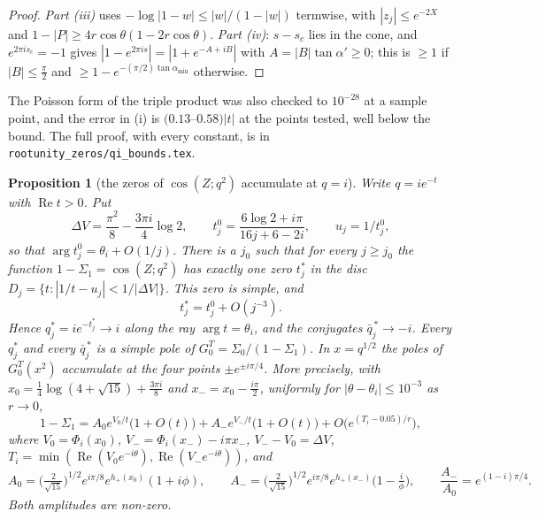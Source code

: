 \documentclass[11pt]{article}
\theoremstyle{plain}
\newtheorem{proposition}[theorem]{Proposition}
\theoremstyle{definition}
\theoremstyle{remark}
\theoremstyle{plain}\newtheorem*{maintheorem}{Main Theorem}
\begin{document}
\begin{proof}
\emph{Part \textup{(iii)}} uses $-\log|1-w|\le|w|/(1-|w|)$ termwise, with $|z_j|\le e^{-2X}$ and
$1-|P|\ge4r\cos\theta(1-2r\cos\theta)$. \emph{Part \textup{(iv)}}: $s-s_c$ lies in the cone, and
$e^{2\pi is_c}=-1$ gives $|1-e^{2\pi is}|=|1+e^{-A+iB}|$ with $A=|B|\tan\alpha'\ge0$; this is $\ge1$ if
$|B|\le\frac\pi2$ and $\ge1-e^{-(\pi/2)\tan\alpha_{\min}}$ otherwise.
\end{proof}

\noindent The Poisson form of the triple product was also checked to $10^{-28}$ at a sample point, and
the error in (i) is $(0.13$--$0.58)|t|$ at the points tested, well below the bound. The full proof, with
every constant, is in \texttt{rootunity\_zeros/qi\_bounds.tex}.

\begin{proposition}[the zeros of $\cos(Z;q^2)$ accumulate at $q=i$]\label{prop:qi}
Write $q=ie^{-t}$ with $\operatorname{Re}t>0$. Put
\[
   \Delta V=\frac{\pi^2}8-\frac{3\pi i}4\log2,\qquad
   t^0_j=\frac{6\log2+i\pi}{16j+6-2i},\qquad u_j=1/t^0_j ,
\]
so that $\arg t^0_j=\theta_i+O(1/j)$. There is a $j_0$ such that for every $j\ge j_0$ the function
$1-\Sigma_1=\cos(Z;q^2)$ has exactly one zero $t^\ast_j$ in the disc
$D_j=\{t:|1/t-u_j|<1/|\Delta V|\}$. This zero is simple, and
\[
   t^\ast_j=t^0_j+O(j^{-3}).
\]
Hence $q^\ast_j=ie^{-t^\ast_j}\to i$ along the ray $\arg t=\theta_i$, and the conjugates
$\bar q^{\,\ast}_j\to-i$. Every $q^\ast_j$ and every $\bar q^{\,\ast}_j$ is a simple pole of
$G^T_0=\Sigma_0/(1-\Sigma_1)$. In $x=q^{1/2}$ the poles of $G^T_0(x^2)$ accumulate at the four points
$\pm e^{\pm i\pi/4}$. More precisely, with $x_0=\frac14\log(4+\sqrt{15})+\frac{3\pi i}8$ and
$x_-=x_0-\frac{i\pi}2$, uniformly for $|\theta-\theta_i|\le10^{-3}$ as $r\to0$,
\begin{equation}\label{eq:qitwosaddle}
   1-\Sigma_1=A_0e^{V_0/t}\bigl(1+O(t)\bigr)+A_-e^{V_-/t}\bigl(1+O(t)\bigr)
   +O\bigl(e^{(T_i-0.05)/r}\bigr),
\end{equation}
where $V_0=\Phi_i(x_0)$, $V_-=\Phi_i(x_-)-i\pi x_-$, $V_--V_0=\Delta V$,
$T_i=\min(\operatorname{Re}(V_0e^{-i\theta}),\operatorname{Re}(V_-e^{-i\theta}))$, and
\[
   A_0=\bigl(\tfrac2{\sqrt{15}}\bigr)^{1/2}e^{i\pi/8}e^{h_+(x_0)}(1+i\phi),\qquad
   A_-=\bigl(\tfrac2{\sqrt{15}}\bigr)^{1/2}e^{i\pi/8}e^{h_+(x_-)}\bigl(1-\tfrac i\phi\bigr),\qquad
   \frac{A_-}{A_0}=e^{(1-i)\pi/4}.
\]
Both amplitudes are non-zero.
\end{proposition}
\end{document}
